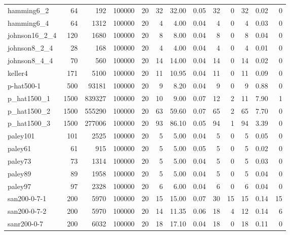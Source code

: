 \begin{tabular}{lrrrrrrrrrrrr}
hamming6\_2 & 64 & 192 & 100000 & 20 & 32 & 32.00 & 0.05 & 32 & 0 & 32 & 0.02 & 0 \\
hamming6\_4 & 64 & 1312 & 100000 & 20 & 4 & 4.00 & 0.04 & 4 & 0 & 4 & 0.03 & 0 \\
johnson16\_2\_4 & 120 & 1680 & 100000 & 20 & 8 & 8.00 & 0.04 & 8 & 0 & 8 & 0.04 & 0 \\
johnson8\_2\_4 & 28 & 168 & 100000 & 20 & 4 & 4.00 & 0.04 & 4 & 0 & 4 & 0.01 & 0 \\
johnson8\_4\_4 & 70 & 560 & 100000 & 20 & 14 & 14.00 & 0.04 & 14 & 0 & 14 & 0.02 & 0 \\
keller4 & 171 & 5100 & 100000 & 20 & 11 & 10.95 & 0.04 & 11 & 0 & 11 & 0.09 & 0 \\
p-hat500-1 & 500 & 93181 & 100000 & 20 & 9 & 8.20 & 0.04 & 9 & 0 & 9 & 0.88 & 0 \\
p\_hat1500\_1 & 1500 & 839327 & 100000 & 20 & 10 & 9.00 & 0.07 & 12 & 2 & 11 & 7.90 & 1 \\
p\_hat1500\_2 & 1500 & 555290 & 100000 & 20 & 63 & 59.60 & 0.07 & 65 & 2 & 65 & 7.70 & 0 \\
p\_hat1500\_3 & 1500 & 277006 & 100000 & 20 & 93 & 86.10 & 0.05 & 94 & 1 & 94 & 3.39 & 0 \\
paley101 & 101 & 2525 & 100000 & 20 & 5 & 5.00 & 0.04 & 5 & 0 & 5 & 0.05 & 0 \\
paley61 & 61 & 915 & 100000 & 20 & 5 & 5.00 & 0.05 & 5 & 0 & 5 & 0.02 & 0 \\
paley73 & 73 & 1314 & 100000 & 20 & 5 & 5.00 & 0.04 & 5 & 0 & 5 & 0.03 & 0 \\
paley89 & 89 & 1958 & 100000 & 20 & 5 & 5.00 & 0.04 & 5 & 0 & 5 & 0.04 & 0 \\
paley97 & 97 & 2328 & 100000 & 20 & 6 & 6.00 & 0.04 & 6 & 0 & 6 & 0.04 & 0 \\
san200-0-7-1 & 200 & 5970 & 100000 & 20 & 15 & 15.00 & 0.07 & 30 & 15 & 15 & 0.14 & 15 \\
san200-0-7-2 & 200 & 5970 & 100000 & 20 & 14 & 11.35 & 0.06 & 18 & 4 & 12 & 0.14 & 6 \\
sanr200-0-7 & 200 & 6032 & 100000 & 20 & 18 & 17.10 & 0.04 & 18 & 0 & 18 & 0.11 & 0 \\
\bottomrule
\end{tabular}

